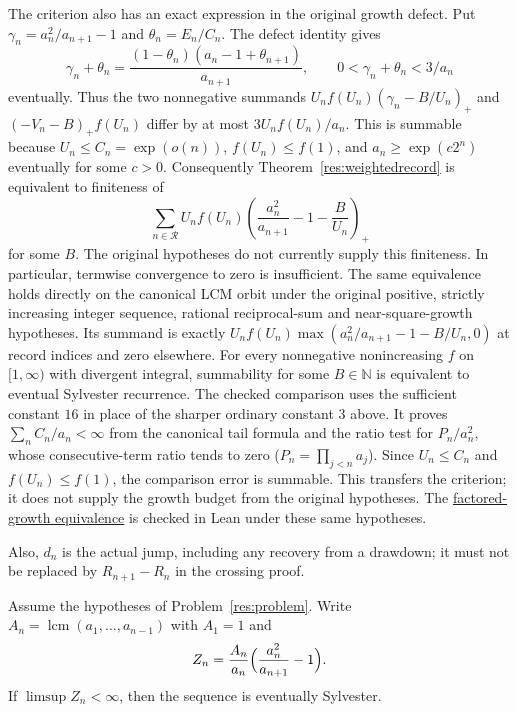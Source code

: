 \documentclass[11pt]{article}
\begin{document}
The criterion also has an exact expression in the original growth defect.
Put $\gamma_n=a_n^2/a_{n+1}-1$ and $\theta_n=E_n/C_n$. The defect identity
gives
\[
 \gamma_n+\theta_n=
 \frac{(1-\theta_n)(a_n-1+\theta_{n+1})}{a_{n+1}},
 \qquad 0<\gamma_n+\theta_n<3/a_n
\]
eventually. Thus the two nonnegative summands
$U_nf(U_n)(\gamma_n-B/U_n)_+$ and $(-V_n-B)_+f(U_n)$ differ by at most
$3U_nf(U_n)/a_n$. This is summable because
$U_n\le C_n=\exp(o(n))$, $f(U_n)\le f(1)$, and
$a_n\ge\exp(c2^n)$ eventually for some $c>0$.
Consequently Theorem~\ref{res:weightedrecord} is equivalent to finiteness of
\begin{equation}\label{eq:weightedgrowth}
 \sum_{n\in\mathcal R}U_nf(U_n)
 \left(\frac{a_n^2}{a_{n+1}}-1-\frac B{U_n}\right)_+
\end{equation}
for some $B$. The original hypotheses do not currently supply this
finiteness. In particular, termwise convergence to zero is insufficient.
The same equivalence holds directly on the canonical LCM orbit under the
original positive, strictly increasing integer sequence, rational reciprocal-sum
and near-square-growth hypotheses.  Its summand is exactly
$U_nf(U_n)\max(a_n^2/a_{n+1}-1-B/U_n,0)$ at record indices and zero elsewhere.
For every nonnegative nonincreasing $f$ on $[1,\infty)$
with divergent integral, summability for some $B\in\mathbb N$ is equivalent to eventual Sylvester
recurrence.  The checked comparison uses the sufficient constant $16$ in
place of the sharper ordinary constant $3$ above.  It proves
$\sum_n C_n/a_n<\infty$ from the canonical tail formula and the ratio test
for $P_n/a_n^2$, whose consecutive-term ratio tends to zero
($P_n=\prod_{j<n}a_j$).  Since $U_n\le C_n$ and $f(U_n)\le f(1)$,
the comparison error is summable.  This transfers the criterion; it does
not supply the growth budget from the original hypotheses.
The \href{https://github.com/wcook04/plectis-erdos/blob/d4fed71423840f70f10edf27b9ad27c22fc4f49a/ErdosProblems/Erdos243/PaperCompleteR8/GrowthDebtSummability.lean#L234}{factored-growth equivalence}
is checked in Lean under these same hypotheses.

Also, $d_n$ is the actual jump, including any recovery from a drawdown; it
must not be replaced by $R_{n+1}-R_n$ in the crossing proof.

\begin{corollary}\label{res:lcmbounded}
Assume the hypotheses of Problem~\ref{res:problem}. Write
$A_n=\operatorname{lcm}(a_1,\ldots,a_{n-1})$ with $A_1=1$ and
\[
 Z_n=\frac{A_n}{a_n}\Bigl(\frac{a_n^2}{a_{n+1}}-1\Bigr).
\]
If $\limsup Z_n<\infty$, then the sequence is eventually Sylvester.
\end{corollary}
\end{document}
